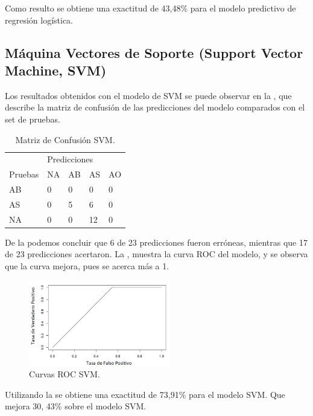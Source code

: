 \documentclass[spanish]{textolivre}
\begin{document}
Como resulto se obtiene una exactitud de 43,48\% para el modelo predictivo de regresión logística.

\subsection{Máquina Vectores de Soporte (Support Vector Machine, SVM)}
Los resultados obtenidos con el modelo de SVM  se puede observar en la , que describe la matriz de confusión de las predicciones del modelo comparados con el set de pruebas.

\begin{table}[htpb]
\centering
\caption{Matriz de Confusión SVM.}
\label{tab4}
\begin{tabular}{lllll}
\toprule 
 & \multicolumn{4}{l}{Predicciones}   \\ 
\cmidrule{2-5}
Pruebas        & NA      & AB       & AS       & AO
\\ 
\midrule
AB             & 0       & 0        & 0        & 0
\\ 
AS             & 0       & 5        & 6        & 0
\\
NA             & 0       & 0        & 12       & 0
\\
\bottomrule
\end{tabular}
\end{table}

De la  podemos concluir que 6 de 23 predicciones fueron erróneas, mientras que 17 de 23 predicciones acertaron. La , muestra la curva ROC del modelo, y se observa que la curva mejora, pues se acerca más a 1.

\begin{figure}[htbp]
 \centering
 \includegraphics[width=0.55\textwidth]{figura9.png}
 \caption{Curvas ROC SVM.}
 \label{figura9}
\end{figure}

Utilizando la  se obtiene una exactitud de 73,91\% para el modelo SVM. Que mejora 30, 43\% sobre el modelo SVM.
\end{document}
